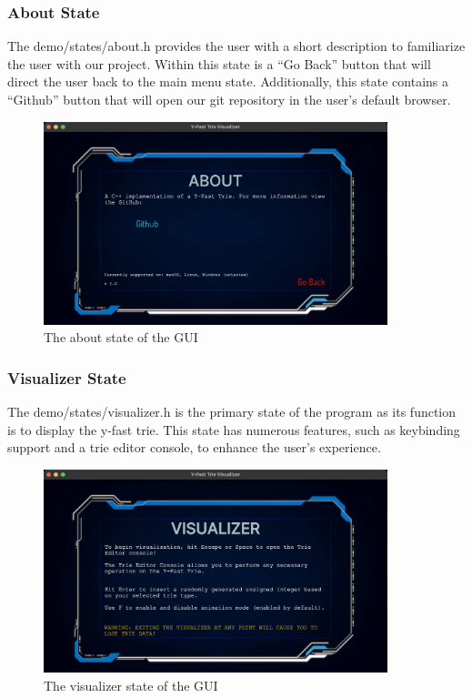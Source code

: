 \documentclass{article}
\begin{document}
\subsubsection{About State}
The demo/states/about.h provides the user with a short description to familiarize the user with our project. Within this state is a “Go Back” button that will direct the user back to the main menu state. Additionally, this state contains a “Github” button that will open our git repository in the user’s default browser.

\begin{figure}[h]
    \centering
    \includegraphics[width = 10cm]{github.png}
    \caption{The about state of the GUI}
\end{figure}

\subsubsection{Visualizer State}
The demo/states/visualizer.h is the primary state of the program as its function is to display the y-fast trie. This state has numerous features, such as keybinding support and a trie editor console, to enhance the user’s experience.

\begin{figure}[h]
    \centering
    \includegraphics[width = 10cm]{tutorial.png}
    \caption{The visualizer state of the GUI}
\end{figure}
\end{document}
